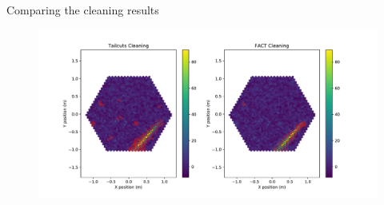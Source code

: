 



\begin{frame}{Comparing the cleaning results}
    \begin{figure}
        \includegraphics[width=\linewidth]{images/cleaning_plots/comparison.pdf}
    \end{figure}
\end{frame}